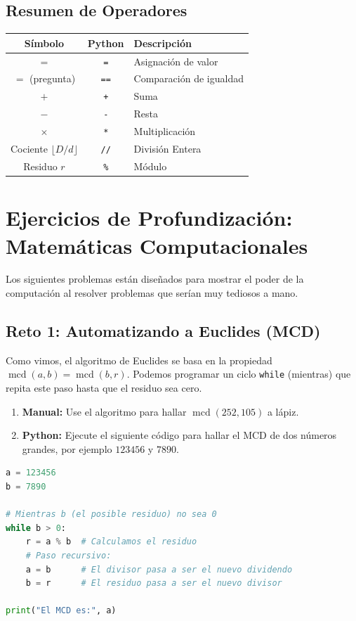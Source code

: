 \subsection*{Resumen de Operadores}
\begin{center}
\begin{tabular}{|c|c|l|}
\hline
\textbf{Símbolo} & \textbf{Python} & \textbf{Descripción} \\
\hline
$=$ & \texttt{=} & Asignación de valor \\
\hline
$=$ (pregunta) & \texttt{==} & Comparación de igualdad \\
\hline
$+$ & \texttt{+} & Suma \\
\hline
$-$ & \texttt{-} & Resta \\
\hline
$\times$ & \texttt{*} & Multiplicación \\
\hline
Cociente $\lfloor D/d \rfloor$ & \texttt{//} & División Entera \\
\hline
Residuo $r$ & \texttt{\%} & Módulo \\
\hline
\end{tabular}
\end{center}

\section{Ejercicios de Profundización: Matemáticas Computacionales}

Los siguientes problemas están diseñados para mostrar el poder de la computación al resolver problemas que serían muy tediosos a mano.

\subsection*{Reto 1: Automatizando a Euclides (MCD)}
Como vimos, el algoritmo de Euclides se basa en la propiedad $\operatorname{mcd}(a, b) = \operatorname{mcd}(b, r)$. Podemos programar un ciclo \texttt{while} (mientras) que repita este paso hasta que el residuo sea cero.

\begin{enumerate}
    \item \textbf{Manual:} Use el algoritmo para hallar $\operatorname{mcd}(252, 105)$ a lápiz.
    \item \textbf{Python:} Ejecute el siguiente código para hallar el MCD de dos números grandes, por ejemplo $123456$ y $7890$.
\end{enumerate}

\begin{lstlisting}[language=Python, caption=Algoritmo de Euclides Automatizado]
a = 123456
b = 7890

# Mientras b (el posible residuo) no sea 0
while b > 0:
    r = a % b  # Calculamos el residuo
    # Paso recursivo:
    a = b      # El divisor pasa a ser el nuevo dividendo
    b = r      # El residuo pasa a ser el nuevo divisor

print("El MCD es:", a)
\end{lstlisting}


